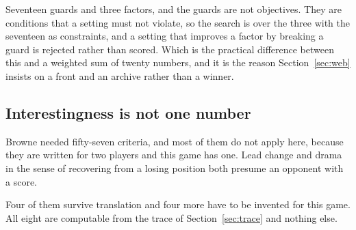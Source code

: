 \documentclass[11pt,a4paper]{article}
\begin{document}
\begin{alarmbox}
Seventeen guards and three factors, and the guards are not objectives. They are conditions that a
setting must not violate, so the search is over the three with the seventeen as constraints, and a
setting that improves a factor by breaking a guard is rejected rather than scored. Which is the
practical difference between this and a weighted sum of twenty numbers, and it is the reason
Section~\ref{sec:web} insists on a front and an archive rather than a winner.
\end{alarmbox}

\subsection{Interestingness is not one number}
\label{sec:criteria}

Browne needed fifty-seven criteria, and most of them do not apply here, because they are written
for two players and this game has one. Lead change and drama in the sense of recovering from a
losing position both presume an opponent with a score.

Four of them survive translation and four more have to be invented for this game. All eight are
computable from the trace of Section~\ref{sec:trace} and nothing else.
\end{document}
